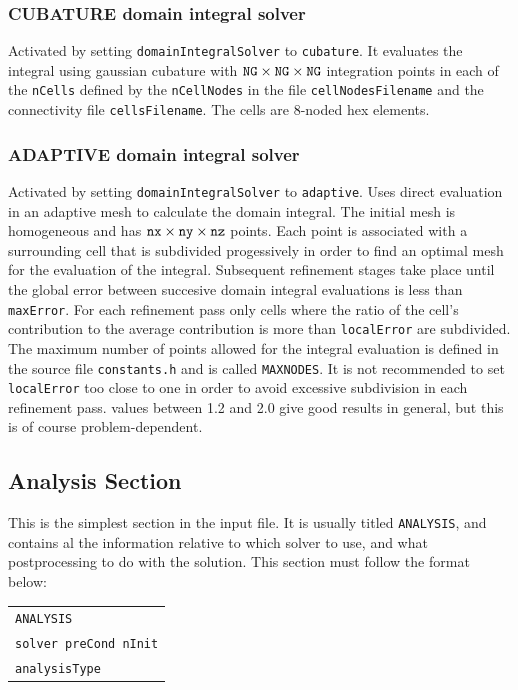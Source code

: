 \documentclass[12pt]{article}
\begin{document}
\subsubsection{CUBATURE domain integral solver}
Activated by setting \verb+domainIntegralSolver+ to \verb+cubature+. It evaluates the integral using gaussian cubature with ${\tt NG}\times{\tt NG}\times{\tt NG}$ integration points in each of the \verb+nCells+ defined by the \verb+nCellNodes+ in the file \verb+cellNodesFilename+ and the connectivity file \verb+cellsFilename+. The cells are 8-noded hex elements.

\subsubsection{ADAPTIVE domain integral solver}
Activated by setting \verb+domainIntegralSolver+ to \verb+adaptive+. Uses direct evaluation in an adaptive mesh to calculate the domain integral. The initial mesh is homogeneous and has ${\tt nx}\times{\tt ny}\times{\tt nz}$ points. Each point is associated with a surrounding cell that is subdivided progessively in order to find an optimal mesh for the evaluation of the integral. Subsequent refinement stages take place until the global error between succesive domain integral evaluations is less than \verb+maxError+. For each refinement pass only cells where the ratio of the cell's contribution to the average contribution is more than \verb+localError+ are subdivided. The maximum number of points allowed for the integral evaluation is defined in the source file \verb+constants.h+ and is called \verb+MAXNODES+. It is not recommended to set \verb+localError+ too close to one in order to avoid excessive subdivision in each refinement pass. values between 1.2 and 2.0 give good results in general, but this is of course problem-dependent.

\subsection{Analysis Section}
This is the simplest section in the input file. It is usually titled \verb+ANALYSIS+, and contains al the information relative to which solver to use, and what postprocessing to do with the solution. This section must follow the format below:

\begin{tabular}{l}
\texttt{ANALYSIS}\\
\texttt{solver preCond nInit}\\
\texttt{analysisType}\\
\end{tabular}
\end{document}
